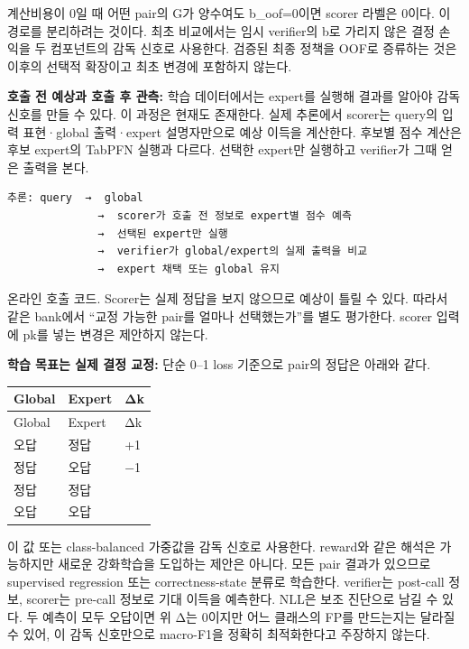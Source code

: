 계산비용이 0일 때 어떤 pair의 G가 양수여도 b\_\allowbreak{}oof=\allowbreak{}0이면 scorer 라벨은 0이다. 이 경로를 분리하려는 것이다. 최초 비교에서는 임시 verifier의 b로 가리지 않은 결정 손익을 두 컴포넌트의 감독 신호로 사용한다. 검증된 최종 정책을 OOF로 증류하는 것은 이후의 선택적 확장이고 최초 변경에 포함하지 않는다.

\par\noindent \textbullet\enspace \textbf{호출 전 예상과 호출 후 관측:} 학습 데이터에서는 expert를 실행해 결과를 알아야 감독 신호를 만들 수 있다. 이 과정은 현재도 존재한다. 실제 추론에서 scorer는 query의 입력 표현·global 출력·expert 설명자만으로 예상 이득을 계산한다. 후보별 점수 계산은 후보 expert의 TabPFN 실행과 다르다. 선택한 expert만 실행하고 verifier가 그때 얻은 출력을 본다.



\begin{Verbatim}[breaklines=true,breakanywhere=true,fontsize=\scriptsize]
추론: query  →  global
              →  scorer가 호출 전 정보로 expert별 점수 예측
              →  선택된 expert만 실행
              →  verifier가 global/expert의 실제 출력을 비교
              →  expert 채택 또는 global 유지

\end{Verbatim}
온라인 호출 코드. Scorer는 실제 정답을 보지 않으므로 예상이 틀릴 수 있다. 따라서 같은 bank에서 “교정 가능한 pair를 얼마나 선택했는가”를 별도 평가한다. scorer 입력에 pk를 넣는 변경은 제안하지 않는다.

\par\noindent \textbullet\enspace \textbf{학습 목표는 실제 결정 교정:} 단순 0–1 loss 기준으로 pair의 정답은 아래와 같다.


\begingroup
\footnotesize
\begin{longtable}{>{\raggedright\arraybackslash}p{}>{\raggedright\arraybackslash}p{}>{\raggedleft\arraybackslash}p{}}
\toprule
Global & Expert & Δk \\ \midrule
\endfirsthead
Global & Expert & Δk \\ \midrule
\endhead
{}오답 & 정답 & +\allowbreak{}1 \\
{}정답 & 오답 & −1 \\
{}정답 & 정답 & 0 \\
{}오답 & 오답 & 0 \\
\bottomrule
\end{longtable}
\endgroup
이 값 또는 class-balanced 가중값을 감독 신호로 사용한다. reward와 같은 해석은 가능하지만 새로운 강화학습을 도입하는 제안은 아니다. 모든 pair 결과가 있으므로 supervised regression 또는 correctness-state 분류로 학습한다. verifier는 post-call 정보, scorer는 pre-call 정보로 기대 이득을 예측한다. NLL은 보조 진단으로 남길 수 있다. 두 예측이 모두 오답이면 위 Δ는 0이지만 어느 클래스의 FP를 만드는지는 달라질 수 있어, 이 감독 신호만으로 macro-F1을 정확히 최적화한다고 주장하지 않는다.

